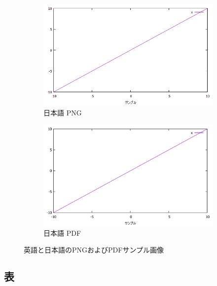 \documentclass[11pt]{jsarticle}
\begin{document}
\begin{figure}[h]
    \begin{subfigure}[b]{0.4\textwidth}
        \centering
        \includegraphics[width=\textwidth]{figure/サンプル.png}
        \caption{日本語 PNG}
        \label{fig:sample-png-ja}
    \end{subfigure}
    \hfill
    \begin{subfigure}[b]{0.4\textwidth}
        \centering
        \includegraphics[width=\textwidth]{figure/サンプル.pdf}
        \caption{日本語 PDF}
        \label{fig:sample-pdf-ja}
    \end{subfigure}
    
    \caption{英語と日本語のPNGおよびPDFサンプル画像}
    \label{fig:all-images}
\end{figure}

\clearpage

\subsection{表} %
\end{document}
